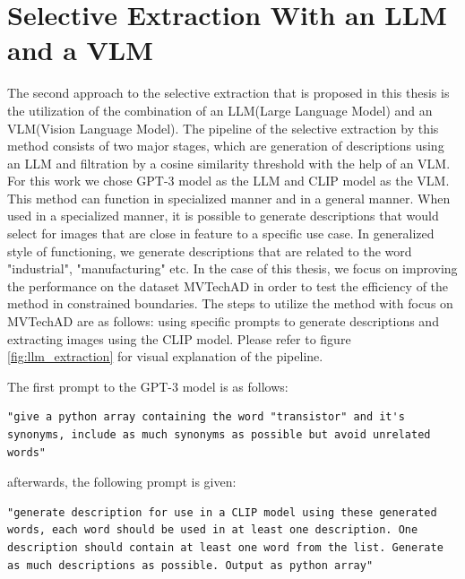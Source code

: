 \section{Selective Extraction With an LLM and a VLM}
\label{sec:llm_and_vlm_extraction}
The second approach to the selective extraction that is proposed in this thesis is the utilization of the combination of an LLM(Large Language Model)\cite{llm_survey} and an VLM(Vision Language Model)\cite{vlm_survey}. The pipeline of the selective extraction by this method consists of two major stages, which are generation of descriptions using an LLM and filtration by a cosine similarity threshold with the help of an VLM. For this work we chose GPT-3\cite{gpt3} model as the LLM and CLIP\cite{clip} model as the VLM. This method can function in specialized manner and in a general manner. When used in a specialized manner, it is possible to generate descriptions that would select for images that are close in feature to a specific use case. In generalized style of functioning, we generate descriptions that are related to the word "industrial", "manufacturing" etc. In the case of this thesis, we focus on improving the performance on the dataset MVTechAD\cite{mvtecad} in order to test the efficiency of the method in constrained boundaries. The steps to utilize the method with focus on MVTechAD are as follows: using specific prompts to generate descriptions and extracting images using the CLIP model. Please refer to figure \ref{fig:llm_extraction} for visual explanation of the pipeline.

The first prompt to the GPT-3 model is as follows:

\begin{lstlisting}
"give a python array containing the word "transistor" and it's synonyms, include as much synonyms as possible but avoid unrelated words"
\end{lstlisting}

afterwards, the following prompt is given:

\begin{lstlisting}
"generate description for use in a CLIP model using these generated words, each word should be used in at least one description. One description should contain at least one word from the list. Generate as much descriptions as possible. Output as python array"
\end{lstlisting}

